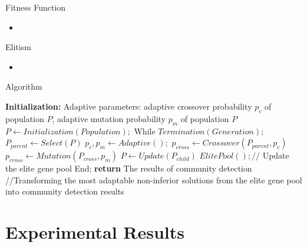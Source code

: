 \documentclass[aspectratio=169,xcolor=dvipsnames]{beamer}
\begin{document}

\begin{frame}{Fitness Function}
    \begin{itemize}
        \item 
    \end{itemize}
\end{frame}


\begin{frame}{Elitism}
    \begin{itemize}
        \item 
    \end{itemize}
\end{frame}

\begin{frame}{Algorithm}
    \begin{algorithm}[H]
        \begin{algorithmic}[1]
        \STATE \textbf{Initialization:} Adaptive parameters: adaptive crossover probability $p_{c}$ of
        population $P$, adaptive mutation probability $p_{m}$ of population $P$
        \STATE $P \leftarrow Initialization(Population);$
        \STATE While $Termination(Generation)$;
        \STATE $P_{parent} \leftarrow Select(P)$
        \STATE $p_{c}, p_{m} \leftarrow Adaptive();$
        \STATE $p_{cross} \leftarrow Crossover(P_{parent}, p_{c})$
        \STATE $p_{cross} \leftarrow Mutation(P_{cross}, p_{m})$
        \STATE $P \leftarrow Update(P_{child})$
        \STATE $ElitePool();//$ {Update the elite gene pool}
        \STATE End;
        \STATE \textbf{return} The results of community detection //{Transforming the most adaptable non-inferior solutions from the elite gene pool into community detection results}
        \end{algorithmic}
        \caption{Framework of F-SGCD Algorithm}
        \label{alg:seq}
    \end{algorithm}
\end{frame}


\section{Experimental Results}
\end{document}
